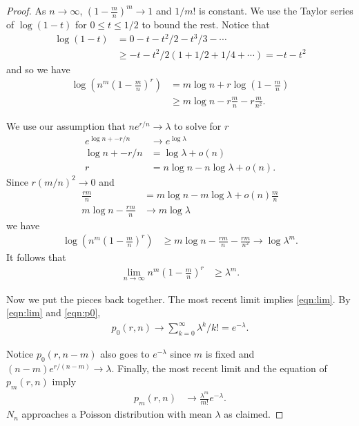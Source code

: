 \documentclass[12pt]{article}
\theoremstyle{definition}
\begin{document}
\begin{proof}
As $n \rightarrow \infty$, $\left(1-\frac{m}{n}\right)^m \rightarrow 1$
and $1/m!$ is constant.
We use the Taylor series of $\log(1-t)$ for $0 \leq t \leq 1/2$
to bound the rest.
Notice that
\begin{align}
\log(1-t) &= 0 - t - t^2/2 -t^3/3 - \cdots \nonumber\\
&\geq -t -t^2/2(1 + 1/2 + 1/4 + \cdots) = -t - t^2 \nonumber
\end{align}
and so we have
\begin{align}
\log \left(n^m\left(1-\frac{m}{n}\right)^r \right)
&= m \log n + r \log\left(1-\frac{m}{n}\right) \nonumber \\
& \geq m \log n - r\frac{m}{n} - r\frac{m}{n^2}. \nonumber
\end{align}

We use our assumption that $ne^{r/n} \rightarrow \lambda$
to solve for $r$
\begin{align}
e^{\log n + -r/n} &\rightarrow e^{\log \lambda} \nonumber\\
\log n + -r/n &= \log \lambda + o(n) \nonumber \\
r &= n \log n - n \log \lambda + o(n). \nonumber
\end{align}
Since $r (m/n)^2 \rightarrow 0$ and
\begin{align}
\frac{rm}{n} &=m \log n - m \log \lambda + o(n)\frac{m}{n} \nonumber \\
 m \log n - \frac{rm}{n}&\rightarrow m \log \lambda \nonumber
\end{align}
we have
\begin{align}
\log \left(n^m\left(1-\frac{m}{n}\right)^r \right)
&\geq m \log n - \frac{rm}{n} - \frac{rm}{n^2} \rightarrow \log \lambda^m. \nonumber
\end{align}
It follows that
\begin{align}
\lim_{n\rightarrow \infty} n^m\left(1-\frac{m}{n}\right)^r
&\geq \lambda^m. \nonumber
\end{align}

Now we put the pieces back together.
The most recent limit implies \cref{eqn:lim}.
By \cref{eqn:lim} and \cref{eqn:p0},
\begin{align}
p_0(r,n) \rightarrow \sum_{k=0}^\infty \lambda^k /k! = e^{-\lambda}. \nonumber
\end{align}

Notice $p_0(r,n-m)$ also goes to $e^{-\lambda}$
since $m$ is fixed and $(n-m)e^{r/(n-m)} \rightarrow \lambda$.
Finally, the most recent limit and the equation of $p_m(r,n)$ imply
\begin{align}
p_m(r,n) 
&\rightarrow \frac{\lambda^m}{ m!} e^{-\lambda} \nonumber.
\end{align}
$N_n$ approaches a Poisson distribution with mean $\lambda$ as claimed.

\end{proof}
\end{document}
